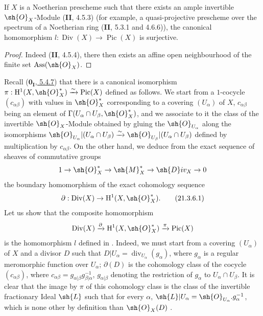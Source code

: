\begin{corollary}[21.3.5]
\label{IV.21.3.5}
If $X$ is a Noetherian prescheme such that there exists an ample invertible $\sh{O}_X$-Module (\textbf{II}, 4.5.3) (for example, a quasi-projective prescheme over the spectrum of a Noetherian ring (\textbf{II}, 5.3.1 and 4.6.6)), the canonical homomorphism $l:\operatorname{Div}(X)\to\operatorname{Pic}(X)$ is surjective.
\end{corollary}

\begin{proof}

Indeed (\textbf{II}, 4.5.4), there then exists an affine open neighbourhood of the finite set $\operatorname{Ass}(\sh{O}_X)$.
\end{proof}

\begin{remark}[21.3.6]
\label{IV.21.3.6}
Recall (\hyperref[0.5.4.7]{$\mathbf{0_I}$, 5.4.7}) that there is a canonical isomorphism $\pi:\mathrm{H}^1(X,\sh{O}_X^*)\xrightarrow{\sim}\operatorname{Pic}(X)$ defined as follows.
We start from a $1$-cocycle $(c_{\alpha\beta})$ with values in $\sh{O}_X^*$ corresponding to a covering $(U_\alpha)$ of $X$, $c_{\alpha\beta}$ being an element of $\Gamma(U_\alpha\cap U_\beta,\sh{O}_X^*)$, and we associate to it the class of the invertible $\sh{O}_X$-Module obtained by gluing the $\sh{O}_{U_\alpha}$ along the isomorphisms $\sh{O}_{U_\alpha}|(U_\alpha\cap U_\beta)\xrightarrow{\sim}\sh{O}_{U_\beta}|(U_\alpha\cap U_\beta)$ defined by multiplication by $c_{\alpha\beta}$.
On the other hand, we deduce from the exact sequence of sheaves of commutative groups
\[
  1\to\sh{O}_X^*\to\sh{M}_X^*\to\sh{D}iv_X\to 0
\]
the boundary homomorphism of the exact cohomology sequence
\[
\label{IV.21.3.6.1}
  \partial:\operatorname{Div}(X)\to\mathrm{H}^1(X,\sh{O}_X^*).
  \tag{21.3.6.1}
\]
Let us show that the composite homomorphism
\[
  \operatorname{Div}(X)\xrightarrow{\partial}\mathrm{H}^1(X,\sh{O}_X^*)\xrightarrow{\pi}\operatorname{Pic}(X)
\]
is the homomorphism $l$ defined in .
Indeed, we must start from a covering $(U_\alpha)$ of $X$ and a divisor $D$ such that $D|U_\alpha=\operatorname{div}_{U_\alpha}(g_\alpha)$, where $g_\alpha$ is a regular meromorphic function over $U_\alpha$;
$\partial(D)$ is the cohomology class of the cocycle $(c_{\alpha\beta})$, where $c_{\alpha\beta}=g_{\alpha|\beta}g_{\beta|\alpha}^{-1}$, $g_{\alpha|\beta}$ denoting the restriction of $g_\alpha$ to $U_\alpha\cap U_\beta$.
It is clear that the image by $\pi$ of this cohomology class is the class of the invertible fractionary Ideal $\sh{L}$ such that for every $\alpha$, $\sh{L}|U_\alpha=\sh{O}_{U_\alpha}.g_\alpha^{-1}$, which is none other by definition than $\sh{O}_X(D)$ .
\end{remark}

